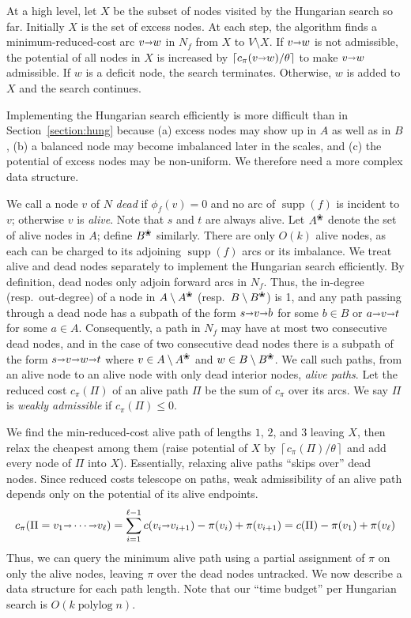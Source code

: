 \documentclass[11pt]{article}
\def\polylog{\mathop{\mathrm{polylog}}}
\def\Ceil#1{\left\lceil #1 \right\rceil}
\def\fsupply{\phi}
\def\arcto{\mathord\shortrightarrow}
\def\arc#1#2{#1\arcto#2}
\def\supp{\operatorname{supp}}
\def\alive#1{{#1}^\text{\ding{96}}}
\def\dead#1{{#1} \setminus \alive{#1}}
\theoremstyle{plain}
\numberwithin{figure}{section}
\def\EMPH#1{\textcolor{BrickRed}{{\emph{#1}}}}
\begin{document}
At a high level, let \EMPH{$X$} be the subset of nodes visited by the Hungarian search
so far.
Initially $X$ is the set of excess nodes.
At each step, the algorithm finds a minimum-reduced-cost arc $\arc vw$ in $N_f$
from $X$ to $V \setminus X$.
If $\arc vw$ is not admissible, the potential of all nodes in $X$ is increased
by $\Ceil{c_\pi(\arc vw)/\theta}$ to make $\arc vw$ admissible.
If $w $ is a deficit node, the search terminates.
Otherwise, $w$ is added to $X$ and the search continues.

Implementing the Hungarian search efficiently is more difficult than in
Section~\ref{section:hung} because (a) excess nodes may show up in $A$ as well as in $B$,
(b) a balanced node may become imbalanced later in the scales,
and (c) the potential of excess nodes may be non-uniform.
We therefore need a more complex data structure.

We call a node $v$ of $N$ \EMPH{dead} if $\fsupply_f(v) = 0$ and no arc of
$\supp(f)$ is incident to $v$; otherwise $v$ is \EMPH{alive}.
Note that $s$ and $t$ are always alive.
Let \EMPH{$\alive{A}$} denote the set of alive nodes in $A$; define \EMPH{$\alive{B}$} similarly.
There are only $O(k)$ alive nodes, as each can be charged to its
adjoining $\supp(f)$ arcs or its imbalance.
We treat alive and dead nodes separately to implement the Hungarian search
efficiently.
By definition, dead nodes only adjoin forward arcs in $N_f$.
Thus, the in-degree (resp.\ out-degree) of a node in $\dead{A}$ (resp.\ $\dead{B}$)
is 1, and any path passing through a dead node has a subpath of the form
$s \arcto v \arcto b$ for some $b \in B$ or $a \arcto v \arcto t$ for some $a \in A$.
Consequently, a path in $N_f$ may have at most two consecutive dead nodes,
and in the case of two consecutive dead nodes there is a subpath of the
form $s \arcto v \arcto w \arcto t$ where $v \in \dead{A}$ and $w \in \dead{B}$.
We call such paths, from an alive node to an alive node
with only dead interior nodes, \EMPH{alive paths}.
Let the reduced cost $c_\pi(\Pi)$ of an alive path $\Pi$ be the sum of $c_\pi$ over its arcs.
We say $\Pi$ is \EMPH{weakly admissible} if $c_\pi(\Pi) \leq 0$.

We find the min-reduced-cost alive path of lengths $1$, $2$, and $3$
leaving $X$, then relax the cheapest among them
(raise potential of $X$ by $\Ceil{c_\pi(\Pi)/\theta}$ and add every node of $\Pi$ into $X$).
Essentially, relaxing alive paths ``skips over'' dead nodes.
Since reduced costs telescope on paths, weak admissibility of an alive path
depends only on the potential of its alive endpoints.
\[
c_\pi(\Pi = v_1 \arcto \cdots \arcto v_\ell)
	= \sum_{i=1}^{\ell-1} c(\arc{v_i}{v_{i+1}}) - \pi(v_i) + \pi(v_{i+1})
	= c(\Pi) - \pi(v_1) + \pi(v_\ell)
\]
Thus, we can query the minimum alive path using a partial assignment
of $\pi$ on only the alive nodes, leaving $\pi$ over the dead nodes untracked.
%
We now describe a data structure for each path length.
Note that our ``time budget'' per Hungarian search is $O(k\polylog n)$.
\end{document}

